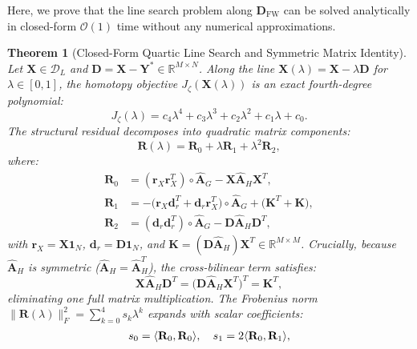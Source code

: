 \documentclass[conference]{IEEEtran}
\newtheorem{theorem}{Theorem}
\begin{document}
Here, we prove that the line search problem along $\mathbf{D}_{\text{FW}}$ can be solved analytically in closed-form $\mathcal{O}(1)$ time without any numerical approximations.

\begin{theorem}[Closed-Form Quartic Line Search and Symmetric Matrix Identity]
\label{thm:quartic_line_search}
Let $\mathbf{X} \in \mathcal{D}_L$ and $\mathbf{D} = \mathbf{X} - \mathbf{Y}^* \in \mathbb{R}^{M \times N}$. Along the line $\mathbf{X}(\lambda) = \mathbf{X} - \lambda \mathbf{D}$ for $\lambda \in [0, 1]$, the homotopy objective $J_\zeta(\mathbf{X}(\lambda))$ is an exact fourth-degree polynomial:
\begin{equation}
J_\zeta(\lambda) = c_4 \lambda^4 + c_3 \lambda^3 + c_2 \lambda^2 + c_1 \lambda + c_0.
\label{eq:quartic_poly}
\end{equation}
The structural residual decomposes into quadratic matrix components:
\begin{equation}
\mathbf{R}(\lambda) = \mathbf{R}_0 + \lambda \mathbf{R}_1 + \lambda^2 \mathbf{R}_2,
\end{equation}
where:
\begin{align}
\mathbf{R}_0 &= (\mathbf{r}_X \mathbf{r}_X^T) \circ \hat{\mathbf{A}}_G - \mathbf{X}\hat{\mathbf{A}}_H\mathbf{X}^T, \\
\mathbf{R}_1 &= -\big(\mathbf{r}_X \mathbf{d}_r^T + \mathbf{d}_r \mathbf{r}_X^T\big) \circ \hat{\mathbf{A}}_G + \big(\mathbf{K}^T + \mathbf{K}\big), \\
\mathbf{R}_2 &= (\mathbf{d}_r \mathbf{d}_r^T) \circ \hat{\mathbf{A}}_G - \mathbf{D}\hat{\mathbf{A}}_H\mathbf{D}^T,
\end{align}
with $\mathbf{r}_X = \mathbf{X}\mathbf{1}_N$, $\mathbf{d}_r = \mathbf{D}\mathbf{1}_N$, and $\mathbf{K} = (\mathbf{D}\hat{\mathbf{A}}_H)\mathbf{X}^T \in \mathbb{R}^{M \times M}$. Crucially, because $\hat{\mathbf{A}}_H$ is symmetric ($\hat{\mathbf{A}}_H = \hat{\mathbf{A}}_H^T$), the cross-bilinear term satisfies:
\begin{equation}
\mathbf{X}\hat{\mathbf{A}}_H\mathbf{D}^T = \big(\mathbf{D}\hat{\mathbf{A}}_H\mathbf{X}^T\big)^T = \mathbf{K}^T,
\label{eq:symm_gemm}
\end{equation}
eliminating one full matrix multiplication. The Frobenius norm $\|\mathbf{R}(\lambda)\|_F^2 = \sum_{k=0}^4 s_k \lambda^k$ expands with scalar coefficients:
\begin{align}
s_0 &= \langle \mathbf{R}_0, \mathbf{R}_0 \rangle, \quad s_1 = 2\langle \mathbf{R}_0, \mathbf{R}_1 \rangle, \notag\\

\end{align}
\end{theorem}
\end{document}
